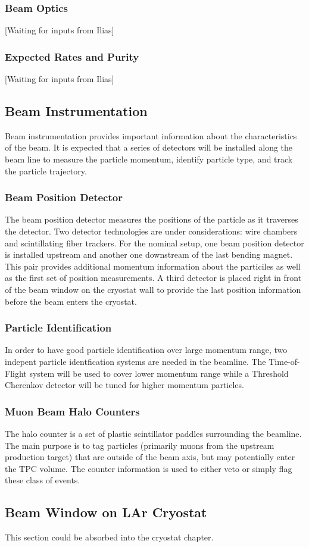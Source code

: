 \subsubsection{Beam Optics}
[Waiting for inputs from Ilias]

\subsubsection{Expected Rates and Purity}
[Waiting for inputs from Ilias]

\subsection{Beam Instrumentation}
Beam instrumentation provides important information about the characteristics of the beam. It is expected that a series of detectors will be installed along the beam line to measure the particle momentum, identify particle type, and track the particle trajectory.

\subsubsection{Beam Position Detector}
The beam position detector measures the positions of the particle as it traverses the detector. Two detector technologies are under considerations: wire chambers and scintillating fiber trackers. For the nominal setup, one beam position detector is installed upstream and another one downstream of the last bending magnet. This pair provides additional momentum information about the particiles as well as the first set of position measurements. A third detector is placed right in front of the beam window on the cryostat wall to provide the last position information before the beam enters the cryostat.

\subsubsection{Particle Identification}
In order to have good particle identification over large momentum range, two indepent particle identfication systems are needed in the beamline. The Time-of-Flight system will be used to cover lower momentum range while a Threshold Cherenkov detector will be tuned for higher momentum particles.

\subsubsection{Muon Beam Halo Counters}
The halo counter is a set of plastic scintillator paddles surrounding the beamline. The main purpose is to tag particles (primarily muons from the upstream production target) that are outside of the beam axis, but may potentially enter the TPC volume. The counter information is used to either veto or simply flag these class of events.

\subsection{Beam Window on LAr Cryostat}
This section could be absorbed into the cryostat chapter.
